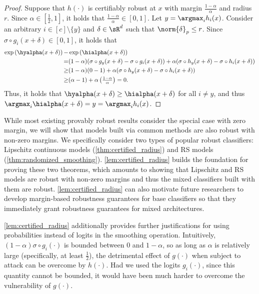 \documentclass[11pt, letterpaper]{article}
\theoremstyle{plain}
\theoremstyle{definition}
\begin{document}
\begin{proof}
Suppose that $h (\cdot)$ is certifiably robust at $x$ with margin $\frac{1-\alpha} {\alpha}$ and radius $r$. Since $\alpha \in [\frac{1}{2}, 1]$, it holds that $\frac{1-\alpha} {\alpha} \in [0, 1]$. Let $y = \argmax_i h_i(x)$. Consider an arbitrary $i \in [c] \setminus \{y\}$ and $\delta \in \sR^d$ such that $\norm{\delta}_p \le r$. Since $\sigma \circ g_i (x+\delta) \in [0, 1]$, it holds that
\begin{align*}
	\exp \left( \hyalpha (x+\delta) \right) - & \exp \left( \hialpha (x+\delta) \right) \\
	= & (1-\alpha) (\sigma \circ g_y (x+\delta) - \sigma \circ g_i (x+\delta)) + \alpha (\sigma \circ h_y (x+\delta) - \sigma \circ h_i (x+\delta)) \\
	\ge & (1-\alpha) (0-1) + \alpha (\sigma \circ h_y (x+\delta) - \sigma \circ h_i (x+\delta)) \\
	\ge & (\alpha - 1) + \alpha \left( \tfrac{1-\alpha} {\alpha} \right) = 0.
\end{align*}
Thus, it holds that $\hyalpha (x+\delta) \geq \hialpha (x+\delta)$ for all $i \neq y$, and thus $\argmax_i \hialpha (x+\delta) = y = \argmax_i h_i (x)$.
\end{proof}

While most existing provably robust results consider the special case with zero margin, we will show that models built via common methods are also robust with non-zero margins. We specifically consider two types of popular robust classifiers: Lipschitz continuous models (\cref{thm:certified_radius}) and RS models (\cref{thm:randomized_smoothing}). \cref{lem:certified_radius} builds the foundation for proving these two theorems, which amounts to showing that Lipschitz and RS models are robust with non-zero margins and thus the mixed classifiers built with them are robust. \cref{lem:certified_radius} can also motivate future researchers to develop margin-based robustness guarantees for base classifiers so that they immediately grant robustness guarantees for mixed architectures.

\cref{lem:certified_radius} additionally provides further justifications for using probabilities instead of logits in the smoothing operation. Intuitively, $(1 - \alpha) \sigma \circ g_i (\cdot)$ is bounded between $0$ and $1 - \alpha$, so as long as $\alpha$ is relatively large (specifically, at least $\frac{1}{2}$), the detrimental effect of $g (\cdot)$ when subject to attack can be overcome by $h (\cdot)$. Had we used the logits $g_i (\cdot)$, since this quantity cannot be bounded, it would have been much harder to overcome the vulnerability of $g (\cdot)$.
\end{document}
